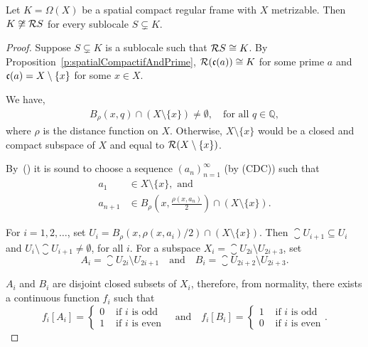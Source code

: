\begin{theorem}
    Let $K = \Omega(X)$ be a spatial compact regular frame with $X$ metrizable. Then $K\not\cong \mathcal{R} S$ for every sublocale $S\subsetneq K$.
\end{theorem}
\begin{proof}
    Suppose $S\subsetneq K$ is a sublocale such that $\mathcal{R} S\cong K$. By Proposition~\ref{p:spatialCompactifAndPrime}, $\mathcal{R}(\mathfrak{c}(a))\cong K$ for some prime $a$ and $\mathfrak{c}(a) = X\setminus \{x\}$ for some $x\in X$.

    We have,
    \begin{align}
        B_\rho(x, q)\cap (X\setminus \{x\}) \neq \emptyset,\quad\text{for all } q\in \mathbb{Q},\label{e:ballsIntersect}
    \end{align}
    where $\rho$ is the distance function on $X$. Otherwise, $X\setminus \{x\}$ would be a closed and compact subspace of $X$ and equal to $\mathcal{R}(X\setminus \{x\})$.

    By~() it is sound to choose a sequence $(a_n)_{n=1}^\infty$ (by (CDC)) such that
    \begin{align*}
        a_1 &\in X\setminus \{x\},\text{ and} \\
        a_{n+1} &\in B_\rho\left(x, \frac{\rho(x,a_n)}{2}\right)\cap (X\setminus \{x\}).
    \end{align*}

    \noindent For $i = 1,2,\dots$, set $U_i = B_\rho(x,\rho(x,a_i)/2)\cap (X\setminus \{x\})$. Then $\closure{U}_{i+1}\subseteq U_i$ and $U_i\setminus \closure{U}_{i+1} \neq \emptyset$, for all $i$.
    For a subspace $X_i = \closure{U}_{2i}\setminus U_{2i+3}$, set
    $$ A_i = \closure{U}_{2i}\setminus U_{2i+1}\quad\text{and}\quad B_i = \closure{U}_{2i+2}\setminus U_{2i+3}. $$

    \noindent $A_i$ and $B_i$ are disjoint closed subsets of $X_i$, therefore, from normality, there exists a continuous function $f_i$ such that
    $$ f_i[A_i] = \begin{cases} 0 & \text{ if }i\text{ is odd} \\ 1 & \text{ if }i\text{ is even}\end{cases}
       \quad\text{and}\quad
       f_i[B_i] = \begin{cases} 1 & \text{ if }i\text{ is odd} \\ 0 & \text{ if }i\text{ is even}\end{cases}. $$


\end{proof}
